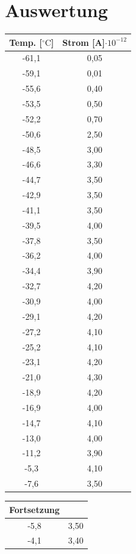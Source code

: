 \section{Auswertung}
\begin{table}
\begin{minipage}{0.45\textwidth}
\begin{tabular}{c|c}
Temp. [$^\circ\text{C}$] & Strom [A]$\cdot 10^{-12}$\\\hline
-61,1	&0,05\\\hline
-59,1	&0,01\\\hline
-55,6	&0,40\\\hline
-53,5	&0,50\\\hline
-52,2	&0,70\\\hline
-50,6	&2,50\\\hline
-48,5	&3,00\\\hline
-46,6	&3,30\\\hline
-44,7	&3,50\\\hline
-42,9	&3,50\\\hline
-41,1	&3,50\\\hline
-39,5	&4,00\\\hline
-37,8	&3,50\\\hline
-36,2	&4,00\\\hline
-34,4	&3,90\\\hline
-32,7	&4,20\\\hline
-30,9	&4,00\\\hline
-29,1	&4,20\\\hline
-27,2	&4,10\\\hline
-25,2	&4,10\\\hline
-23,1	&4,20\\\hline
-21,0	&4,30\\\hline
-18,9	&4,20\\\hline
-16,9	&4,00\\\hline
-14,7	&4,10\\\hline
-13,0	&4,00\\\hline
-11,2	&3,90\\\hline
-5,3	&4,10\\\hline
-7,6	&3,50\\\hline
\end{tabular}
\end{minipage}
\begin{minipage}{0.45\textwidth}
\begin{tabular}{c|c}
Fortsetzung & \\\hline
-5,8	&3,50\\\hline
-4,1	&3,40\\\hline

\end{tabular}
\end{minipage}
\end{table}
